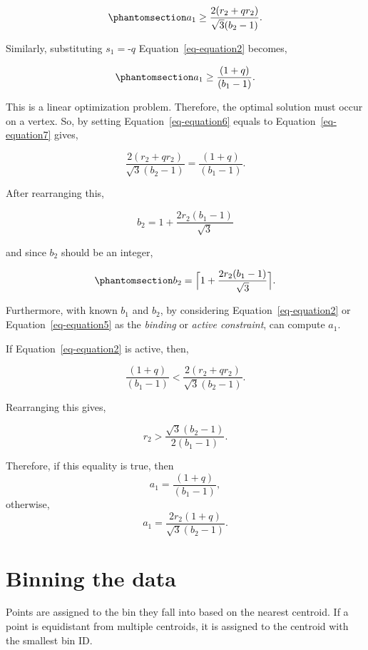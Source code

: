 \documentclass[
  12pt]{article}
\begin{document}
\begin{equation}\protect\phantomsection\label{eq-equation6}{
a_1 \geq \frac{2(r_2 + qr_2)}{\sqrt{3}(b_2 - 1)}.
}\end{equation}

Similarly, substituting \(s_1 = \text{-}q\) Equation~\ref{eq-equation2}
becomes,

\begin{equation}\protect\phantomsection\label{eq-equation7}{
a_1 \geq \frac{(1 + q)}{(b_1 - 1)}.
}\end{equation}

This is a linear optimization problem. Therefore, the optimal solution
must occur on a vertex. So, by setting Equation~\ref{eq-equation6}
equals to Equation~\ref{eq-equation7} gives,

\[
\frac{2(r_2 + qr_2)}{\sqrt{3}(b_2 - 1)} = \frac{(1 + q)}{(b_1 - 1)}.
\]

After rearranging this,

\[
b_2 = 1 + \frac{2r_2(b_1 - 1)}{\sqrt{3}}
\]

and since \(b_2\) should be an integer,

\begin{equation}\protect\phantomsection\label{eq-equation8}{
b_2 = \Big\lceil1 +\frac{2r_2(b_1 - 1)}{\sqrt{3}}\Big\rceil.
}\end{equation}

Furthermore, with known \(b_1\) and \(b_2\), by considering
Equation~\ref{eq-equation2} or Equation~\ref{eq-equation5} as the
\emph{binding} or \emph{active constraint}, can compute \(a_1\).

If Equation~\ref{eq-equation2} is active, then,

\[
\frac{(1 + q)}{(b_1 - 1)} < \frac{2(r_2 + qr_2)}{\sqrt{3}(b_2 - 1)}.
\]

Rearranging this gives,

\[
r_2 > \frac{\sqrt{3}(b_2 - 1)}{2(b_1 - 1)}.
\]

Therefore, if this equality is true, then \[
a_1 = \frac{(1+q)}{(b_1 - 1)},
\] otherwise, \[
a_1 = \frac{2r_2(1+q)}{\sqrt{3}(b_2 - 1)}.
\]

\section{Binning the data}\label{binning-the-data}

Points are assigned to the bin they fall into based on the nearest
centroid. If a point is equidistant from multiple centroids, it is
assigned to the centroid with the smallest bin ID.
\end{document}
